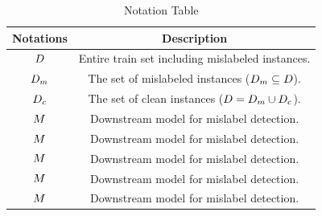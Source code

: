 \begin{table}
	\centering
	\caption{Notation Table}
	\vspace{-1em}
	{
		\begin{tabular}{|c|c|}
			\hline
			{\bf Notations} & {\bf Description}  \\
			\hline	
			$D$ & Entire train set including mislabeled instances. \\\hline
			$D_m$ & The set of mislabeled instances ($D_m \subseteq D$).   \\\hline			
			$D_c$ & The set of clean instances ($ D = D_m \cup D_c $).  \\\hline
			$M$ & Downstream model for mislabel detection.   \\\hline
			$M$ & Downstream model for mislabel detection.   \\\hline
			$M$ & Downstream model for mislabel detection.   \\\hline
			$M$ & Downstream model for mislabel detection.   \\\hline
			$M$ & Downstream model for mislabel detection.   \\\hline	
		\end{tabular}
	}
	\label{tbl:dataset}
	\vspace{-2.2em}
\end{table}



